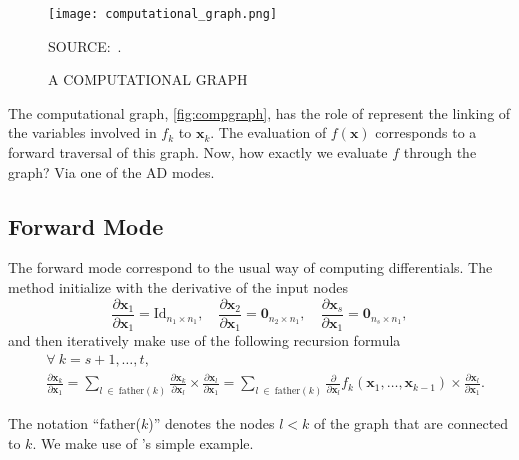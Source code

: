 \begin{figure}[H]
  \setlength{\abovecaptionskip}{.0001pt}
  \caption{A COMPUTATIONAL GRAPH}
  \vspace{0.425cm} \centering
  \texttt{[image: computational\_graph.png]}
  \\
  \vspace{0.45cm}
  \begin{footnotesize}
    SOURCE:~.
  \end{footnotesize}
  \label{fig:compgraph}
\end{figure}

The computational graph, \autoref{fig:compgraph}, has the role of
represent the linking of the variables involved in \(f_{k}\) to
\(\mathbf{x}_{k}\). The evaluation of \(f(\mathbf{x})\) corresponds to a
forward traversal of this graph. Now, how exactly we evaluate \(f\)
through the graph? Via one of the AD modes.

\subsection{Forward Mode}

The forward mode correspond to the usual way of computing differentials.
The method initialize with the derivative of the input nodes
\[
  \frac{\partial \mathbf{x}_{1}}{\partial \mathbf{x}_{1}} =
  \text{Id}_{n_{1} \times n_{1}}, \quad
  \frac{\partial \mathbf{x}_{2}}{\partial \mathbf{x}_{1}} =
  \mathbf{0}_{n_{2} \times n_{1}}, \quad
  \frac{\partial \mathbf{x}_{s}}{\partial \mathbf{x}_{1}} =
  \mathbf{0}_{n_{s} \times n_{1}},
\]
and then iteratively make use of the following recursion formula
\begin{align*}
  &\forall~k = s + 1, \dots, t,\\
  &\frac{\partial\mathbf{x}_{k}}{\partial\mathbf{x}_{1}} =
    \sum_{l~\in~\text{father}(k)}
    \frac{\partial\mathbf{x}_{k}}{\partial\mathbf{x}_{l}} \times
    \frac{\partial\mathbf{x}_{l}}{\partial\mathbf{x}_{1}} =
    \sum_{l~\in~\text{father}(k)}
    \frac{\partial}{\partial\mathbf{x}_{l}}
    f_{k}(\mathbf{x}_{1}, \dots, \mathbf{x}_{k-1}) \times
    \frac{\partial\mathbf{x}_{l}}{\partial\mathbf{x}_{1}}.
\end{align*}

The notation ``father(\(k\))'' denotes the nodes \(l < k\) of the graph
that are connected to \(k\). We make use of 's
simple example.

